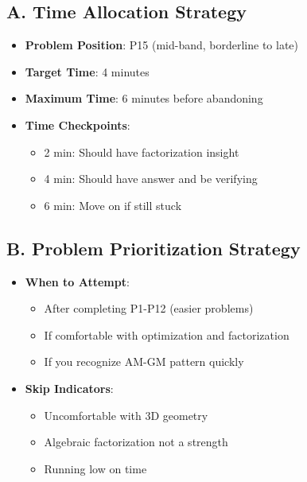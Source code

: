 \documentclass[]{article}
\begin{document}
\begin{competitionbox}
\subsection*{A. Time Allocation Strategy}
\begin{itemize}[leftmargin=*]
    \item \textbf{Problem Position}: P15 (mid-band, borderline to late)
    \item \textbf{Target Time}: 4 minutes
    \item \textbf{Maximum Time}: 6 minutes before abandoning
    \item \textbf{Time Checkpoints}:
    \begin{itemize}
        \item 2 min: Should have factorization insight
        \item 4 min: Should have answer and be verifying
        \item 6 min: Move on if still stuck
    \end{itemize}
\end{itemize}

\subsection*{B. Problem Prioritization Strategy}
\begin{itemize}[leftmargin=*]
    \item \textbf{When to Attempt}: 
    \begin{itemize}
        \item After completing P1-P12 (easier problems)
        \item If comfortable with optimization and factorization
        \item If you recognize AM-GM pattern quickly
    \end{itemize}
    \item \textbf{Skip Indicators}:
    \begin{itemize}
        \item Uncomfortable with 3D geometry
        \item Algebraic factorization not a strength
        \item Running low on time
    \end{itemize}
\end{itemize}


\end{competitionbox}
\end{document}
